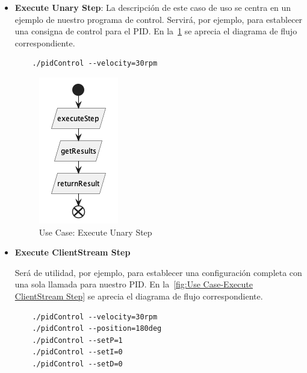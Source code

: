 \begin{itemize}
    \item \textbf{Execute Unary Step}: La descripción de este caso de uso se centra en un ejemplo de nuestro programa de control.
    Servirá, por ejemplo, para establecer una consigna de control para el PID.
    En la~\cref{fig:Use Case-Execute Unary Step} se aprecia el diagrama de flujo correspondiente.

    \begin{verbatim}
    ./pidControl --velocity=30rpm
    \end{verbatim}

    \begin{figure}[H]
        \centering
        \includegraphics[height=0.25\textheight]{./part/Proyecto_ejecutivo/memoria_descriptiva/descripcionDelProyecto/client/uml/executeUnaryStep}
        \caption{Use Case: Execute Unary Step}\label{fig:Use Case-Execute Unary Step}
    \end{figure}

    \item \textbf{Execute ClientStream Step}

    Será de utilidad, por ejemplo, para establecer una configuración completa con una sola llamada para nuestro PID.
    En la~\cref{fig:Use Case-Execute ClientStream Step} se aprecia el diagrama de flujo correspondiente.
    \begin{verbatim}
    ./pidControl --velocity=30rpm
    ./pidControl --position=180deg
    ./pidControl --setP=1
    ./pidControl --setI=0
    ./pidControl --setD=0
    \end{verbatim}


\end{itemize}
